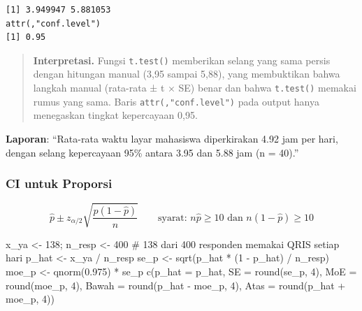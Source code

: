 \documentclass[
  indonesian,
  letterpaper,
]{book}
\newenvironment{Shaded}{\begin{snugshade}}{\end{snugshade}}
\newcommand{\AttributeTok}[1]{\textcolor[rgb]{0.40,0.45,0.13}{#1}}
\newcommand{\CommentTok}[1]{\textcolor[rgb]{0.37,0.37,0.37}{#1}}
\newcommand{\DecValTok}[1]{\textcolor[rgb]{0.68,0.00,0.00}{#1}}
\newcommand{\FloatTok}[1]{\textcolor[rgb]{0.68,0.00,0.00}{#1}}
\newcommand{\FunctionTok}[1]{\textcolor[rgb]{0.28,0.35,0.67}{#1}}
\newcommand{\NormalTok}[1]{\textcolor[rgb]{0.00,0.23,0.31}{#1}}
\newcommand{\OtherTok}[1]{\textcolor[rgb]{0.00,0.23,0.31}{#1}}
\newcommand{\SpecialCharTok}[1]{\textcolor[rgb]{0.37,0.37,0.37}{#1}}
\begin{document}
\begin{verbatim}
[1] 3.949947 5.881053
attr(,"conf.level")
[1] 0.95
\end{verbatim}

\begin{quote}
\textbf{Interpretasi.} Fungsi \texttt{t.test()} memberikan selang yang
sama persis dengan hitungan manual (3,95 sampai 5,88), yang membuktikan
bahwa langkah manual (rata-rata ± t × SE) benar dan bahwa
\texttt{t.test()} memakai rumus yang sama. Baris
\texttt{attr(,"conf.level")} pada output hanya menegaskan tingkat
kepercayaan 0,95.
\end{quote}

\textbf{Laporan}: ``Rata-rata waktu layar mahasiswa diperkirakan 4.92
jam per hari, dengan selang kepercayaan 95\% antara 3.95 dan 5.88 jam (n
= 40).''

\subsubsection{CI untuk Proporsi}\label{ci-untuk-proporsi}

\[\hat{p} \pm z_{\alpha/2}\sqrt{\frac{\hat{p}(1 - \hat{p})}{n}} \qquad \text{syarat: } n\hat{p} \ge 10 \text{ dan } n(1 - \hat{p}) \ge 10\]

\begin{Shaded}
\begin{Highlighting}[]
\NormalTok{x\_ya }\OtherTok{\textless{}{-}} \DecValTok{138}\NormalTok{; n\_resp }\OtherTok{\textless{}{-}} \DecValTok{400} \CommentTok{\# 138 dari 400 responden memakai QRIS setiap hari}
\NormalTok{p\_hat }\OtherTok{\textless{}{-}}\NormalTok{ x\_ya }\SpecialCharTok{/}\NormalTok{ n\_resp}
\NormalTok{se\_p }\OtherTok{\textless{}{-}} \FunctionTok{sqrt}\NormalTok{(p\_hat }\SpecialCharTok{*}\NormalTok{ (}\DecValTok{1} \SpecialCharTok{{-}}\NormalTok{ p\_hat) }\SpecialCharTok{/}\NormalTok{ n\_resp)}
\NormalTok{moe\_p }\OtherTok{\textless{}{-}} \FunctionTok{qnorm}\NormalTok{(}\FloatTok{0.975}\NormalTok{) }\SpecialCharTok{*}\NormalTok{ se\_p}
\FunctionTok{c}\NormalTok{(}\AttributeTok{p\_hat =}\NormalTok{ p\_hat, }\AttributeTok{SE =} \FunctionTok{round}\NormalTok{(se\_p, }\DecValTok{4}\NormalTok{), }\AttributeTok{MoE =} \FunctionTok{round}\NormalTok{(moe\_p, }\DecValTok{4}\NormalTok{),}
\AttributeTok{Bawah =} \FunctionTok{round}\NormalTok{(p\_hat }\SpecialCharTok{{-}}\NormalTok{ moe\_p, }\DecValTok{4}\NormalTok{), }\AttributeTok{Atas =} \FunctionTok{round}\NormalTok{(p\_hat }\SpecialCharTok{+}\NormalTok{ moe\_p, }\DecValTok{4}\NormalTok{))}
\end{Highlighting}
\end{Shaded}
\end{document}
